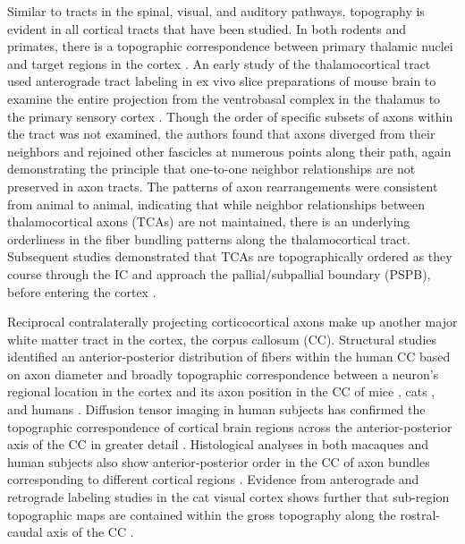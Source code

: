 Similar to tracts in the spinal, visual, and auditory pathways, topography is evident in all cortical tracts that have been studied. 
In both rodents and primates, there is a topographic correspondence between primary thalamic nuclei and target regions in the cortex \cite{caviness1980tangential,hohl1991topographical}. 
An early study of the thalamocortical tract used anterograde tract labeling in ex vivo slice preparations of mouse brain to examine the entire projection from the ventrobasal complex in the thalamus to the primary sensory cortex \cite{bernardo1987axonal}. 
Though the order of specific subsets of axons within the tract was not examined, the authors found that axons diverged from their neighbors and rejoined other fascicles at numerous points along their path, again demonstrating the principle that one-to-one neighbor relationships are not preserved in axon tracts.
The patterns of axon rearrangements were consistent from animal to animal, indicating that while neighbor relationships between thalamocortical axons (TCAs) are not maintained, there is an underlying orderliness in the fiber bundling patterns along the thalamocortical tract. 
Subsequent studies demonstrated that TCAs are topographically ordered as they course through the IC and approach the pallial/subpallial boundary (PSPB), before entering the cortex \cite{molnar1998mechanisms}. 

Reciprocal contralaterally projecting corticocortical axons make up another major white matter tract in the cortex, the corpus callosum (CC). 
Structural studies identified an anterior-posterior distribution of fibers within the human CC based on axon diameter \cite{aboitiz1992fiber} and broadly topographic correspondence between a neuron’s regional location in the cortex and its axon position in the CC of mice \cite{ozaki1992prenatal}, cats \cite{nakamura1989topography}, and humans \cite{de1985topography}. 
Diffusion tensor imaging in human subjects has confirmed the topographic correspondence of cortical brain regions across the anterior-posterior axis of the CC in greater detail \cite{hofer2006topography}. 
Histological analyses in both macaques and human subjects also show anterior-posterior order in the CC of axon bundles corresponding to different cortical regions \cite{caminiti2013diameter}.
Evidence from anterograde and retrograde labeling studies in the cat visual cortex shows further that sub-region topographic maps are contained within the gross topography along the rostral-caudal axis of the CC \cite{payne1991visual}. 

